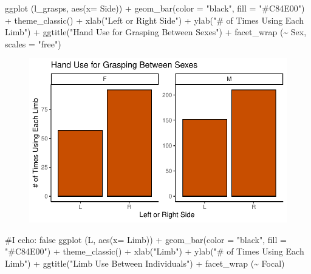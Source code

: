 \documentclass[
  letterpaper,
  DIV=11,
  numbers=noendperiod]{scrartcl}
\newenvironment{Shaded}{\begin{snugshade}}{\end{snugshade}}
\newcommand{\AttributeTok}[1]{\textcolor[rgb]{0.40,0.45,0.13}{#1}}
\newcommand{\CommentTok}[1]{\textcolor[rgb]{0.37,0.37,0.37}{#1}}
\newcommand{\FunctionTok}[1]{\textcolor[rgb]{0.28,0.35,0.67}{#1}}
\newcommand{\NormalTok}[1]{\textcolor[rgb]{0.00,0.23,0.31}{#1}}
\newcommand{\SpecialCharTok}[1]{\textcolor[rgb]{0.37,0.37,0.37}{#1}}
\newcommand{\StringTok}[1]{\textcolor[rgb]{0.13,0.47,0.30}{#1}}
\begin{document}
\begin{Shaded}
\begin{Highlighting}[]
\FunctionTok{ggplot}\NormalTok{ (l\_grasps, }\FunctionTok{aes}\NormalTok{(}\AttributeTok{x=}\NormalTok{ Side)) }\SpecialCharTok{+}
  \FunctionTok{geom\_bar}\NormalTok{(}\AttributeTok{color =} \StringTok{"black"}\NormalTok{, }\AttributeTok{fill =} \StringTok{"\#C84E00"}\NormalTok{) }\SpecialCharTok{+}
  \FunctionTok{theme\_classic}\NormalTok{() }\SpecialCharTok{+}
  \FunctionTok{xlab}\NormalTok{(}\StringTok{"Left or Right Side"}\NormalTok{) }\SpecialCharTok{+}
  \FunctionTok{ylab}\NormalTok{(}\StringTok{"\# of Times Using Each Limb"}\NormalTok{) }\SpecialCharTok{+}
  \FunctionTok{ggtitle}\NormalTok{(}\StringTok{"Hand Use for Grasping Between Sexes"}\NormalTok{) }\SpecialCharTok{+}
  \FunctionTok{facet\_wrap}\NormalTok{ (}\SpecialCharTok{\textasciitilde{}}\NormalTok{ Sex, }\AttributeTok{scales =} \StringTok{"free"}\NormalTok{)}
\end{Highlighting}
\end{Shaded}

\begin{figure}[H]

{\centering \includegraphics{LeftyLemurs_files/figure-pdf/unnamed-chunk-42-1.pdf}

}

\end{figure}

\begin{Shaded}
\begin{Highlighting}[]
\CommentTok{\#I echo: false}
\FunctionTok{ggplot}\NormalTok{ (L, }\FunctionTok{aes}\NormalTok{(}\AttributeTok{x=}\NormalTok{ Limb)) }\SpecialCharTok{+}
  \FunctionTok{geom\_bar}\NormalTok{(}\AttributeTok{color =} \StringTok{"black"}\NormalTok{, }\AttributeTok{fill =} \StringTok{"\#C84E00"}\NormalTok{) }\SpecialCharTok{+}
  \FunctionTok{theme\_classic}\NormalTok{() }\SpecialCharTok{+}
  \FunctionTok{xlab}\NormalTok{(}\StringTok{"Limb"}\NormalTok{) }\SpecialCharTok{+}
  \FunctionTok{ylab}\NormalTok{(}\StringTok{"\# of Times Using Each Limb"}\NormalTok{) }\SpecialCharTok{+}
  \FunctionTok{ggtitle}\NormalTok{(}\StringTok{"Limb Use Between Individuals"}\NormalTok{) }\SpecialCharTok{+}
  \FunctionTok{facet\_wrap}\NormalTok{ (}\SpecialCharTok{\textasciitilde{}}\NormalTok{ Focal)}
\end{Highlighting}
\end{Shaded}
\end{document}
